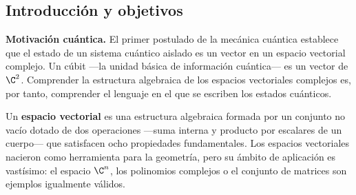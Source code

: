 \portada

\begin{esquemaExplorador}
\end{esquemaExplorador}


\subsection{Introducción y objetivos}

\begin{info}
  \textbf{Motivación cuántica.}
  El primer postulado de la mecánica cuántica establece que el estado de un sistema cuántico aislado es un vector en un espacio vectorial complejo. Un cúbit —la unidad básica de información cuántica— es un vector de $\C^2$. Comprender la estructura algebraica de los espacios vectoriales complejos es, por tanto, comprender el lenguaje en el que se escriben los estados cuánticos.
\end{info}

Un \textbf{espacio vectorial} es una estructura algebraica formada por un conjunto no vacío dotado de dos operaciones —suma interna y producto por escalares de un cuerpo— que satisfacen ocho propiedades fundamentales. Los espacios vectoriales nacieron como herramienta para la geometría, pero su ámbito de aplicación es vastísimo: el espacio $\C^n$, los polinomios complejos o el conjunto de matrices son ejemplos igualmente válidos.

